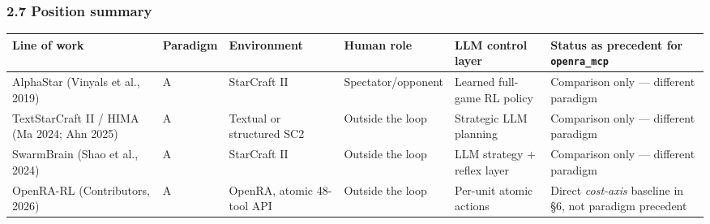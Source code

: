 \documentclass[
  journal]{IEEEtran}
\begin{document}
\subsubsection{2.7 Position summary}\label{position-summary}

\begin{longtable}[]{@{}
  >{\raggedright\arraybackslash}p{}
  >{\raggedright\arraybackslash}p{}
  >{\raggedright\arraybackslash}p{}
  >{\raggedright\arraybackslash}p{}
  >{\raggedright\arraybackslash}p{}
  >{\raggedright\arraybackslash}p{}@{}}
\toprule\noalign{}
\begin{minipage}[b]{\linewidth}\raggedright
Line of work
\end{minipage} & \begin{minipage}[b]{\linewidth}\raggedright
Paradigm
\end{minipage} & \begin{minipage}[b]{\linewidth}\raggedright
Environment
\end{minipage} & \begin{minipage}[b]{\linewidth}\raggedright
Human role
\end{minipage} & \begin{minipage}[b]{\linewidth}\raggedright
LLM control layer
\end{minipage} & \begin{minipage}[b]{\linewidth}\raggedright
Status as precedent for \texttt{openra\_mcp}
\end{minipage} \\
\midrule\noalign{}
\endhead
\bottomrule\noalign{}
\endlastfoot
AlphaStar (Vinyals et al., 2019) & A & StarCraft II & Spectator/opponent
& Learned full-game RL policy & Comparison only --- different
paradigm \\
TextStarCraft II / HIMA (Ma 2024; Ahn 2025) & A & Textual or structured
SC2 & Outside the loop & Strategic LLM planning & Comparison only ---
different paradigm \\
SwarmBrain (Shao et al., 2024) & A & StarCraft II & Outside the loop &
LLM strategy + reflex layer & Comparison only --- different paradigm \\
OpenRA-RL (Contributors, 2026) & A & OpenRA, atomic 48-tool API &
Outside the loop & Per-unit atomic actions & Direct \emph{cost-axis}
baseline in §6, not paradigm precedent \\

\end{longtable}
\end{document}
